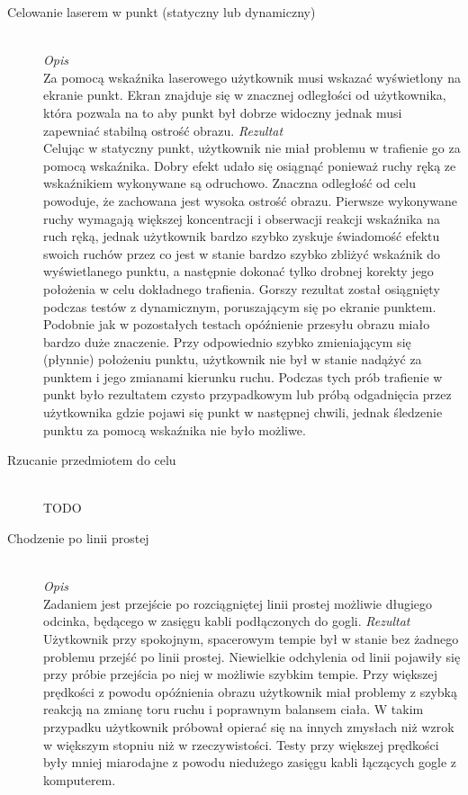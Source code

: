 \documentclass[a4paper,11pt,twoside]{report}
\theoremstyle{definition}
\begin{document}
\begin{description}
\item[Celowanie laserem w punkt (statyczny lub dynamiczny)] \hfill \\
\textit{Opis} \\
Za pomocą wskaźnika laserowego użytkownik musi wskazać wyświetlony na ekranie punkt. Ekran znajduje się w znacznej odległości od użytkownika, która pozwala na to aby punkt był dobrze widoczny jednak musi zapewniać stabilną ostrość obrazu.
\textit{Rezultat} \\
Celując w statyczny punkt, użytkownik nie miał problemu w trafienie go za pomocą wskaźnika. Dobry efekt udało się osiągnąć ponieważ ruchy ręką ze wskaźnikiem wykonywane są odruchowo. Znaczna odległość od celu powoduje, że zachowana jest wysoka ostrość obrazu. Pierwsze wykonywane ruchy wymagają większej koncentracji i obserwacji reakcji wskaźnika na ruch ręką, jednak użytkownik bardzo szybko zyskuje świadomość efektu swoich ruchów przez co jest w stanie bardzo szybko zbliżyć wskaźnik do wyświetlanego punktu, a następnie dokonać tylko drobnej korekty jego położenia w celu dokładnego trafienia. Gorszy rezultat został osiągnięty podczas testów z dynamicznym, poruszającym się po ekranie punktem. Podobnie jak w pozostałych testach opóźnienie przesyłu obrazu miało bardzo duże znaczenie. Przy odpowiednio szybko zmieniającym się (płynnie) położeniu punktu, użytkownik nie był w stanie nadążyć za punktem i jego zmianami kierunku ruchu. Podczas tych prób trafienie w punkt było rezultatem czysto przypadkowym lub próbą odgadnięcia przez użytkownika gdzie pojawi się punkt w następnej chwili, jednak śledzenie punktu  za pomocą wskaźnika nie było możliwe.

\item[Rzucanie przedmiotem do celu] \hfill \\
TODO

\item[Chodzenie po linii prostej] \hfill \\
\textit{Opis} \\
Zadaniem jest przejście po rozciągniętej linii prostej możliwie długiego odcinka, będącego w zasięgu kabli podłączonych do gogli.
\textit{Rezultat} \\
Użytkownik przy spokojnym, spacerowym tempie był w stanie bez żadnego problemu przejść po linii prostej. Niewielkie odchylenia od linii pojawiły się przy próbie przejścia po niej w możliwie szybkim tempie. Przy większej prędkości z powodu opóźnienia obrazu użytkownik miał problemy z szybką reakcją na zmianę toru ruchu i poprawnym balansem ciała. W takim przypadku użytkownik próbował opierać się na innych zmysłach niż wzrok w większym stopniu niż w rzeczywistości. Testy przy większej prędkości były mniej miarodajne z powodu niedużego zasięgu kabli łączących gogle z komputerem.
\end{description}
\end{document}
